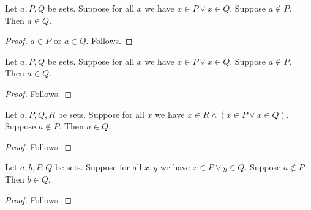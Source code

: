 \begin{proposition}\label{explicit_universal_disjunction}
    Let $a,P,Q$ be sets.
    Suppose for all $x$ we have $x\in P\lor x\in Q$.
    Suppose $a\notin P$.
    Then $a\in Q$.
\end{proposition}
\begin{proof}
    $a\in P$ or $a\in Q$.
    Follows.
\end{proof}

\begin{proposition}\label{obvious_universal_disjunction}
    Let $a,P,Q$ be sets.
    Suppose for all $x$ we have $x\in P\lor x\in Q$.
    Suppose $a\notin P$.
    Then $a\in Q$.
\end{proposition}
\begin{proof}
    Follows.
\end{proof}

\begin{proposition}\label{obvious_partial_universal_conjunction}
    Let $a,P,Q,R$ be sets.
    Suppose for all $x$ we have $x\in R\land(x\in P\lor x\in Q)$.
    Suppose $a\notin P$.
    Then $a\in Q$.
\end{proposition}
\begin{proof}
    Follows.
\end{proof}

\begin{proposition}\label{obvious_nested_universal_disjunction}
    Let $a,b,P,Q$ be sets.
    Suppose for all $x,y$ we have $x\in P\lor y\in Q$.
    Suppose $a\notin P$.
    Then $b\in Q$.
\end{proposition}
\begin{proof}
    Follows.
\end{proof}
